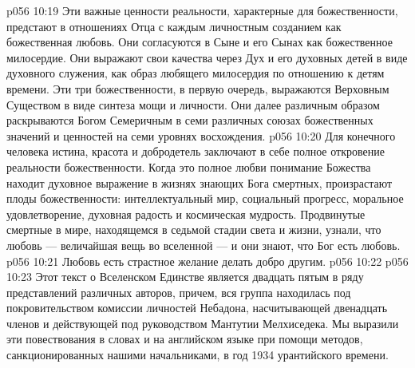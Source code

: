 \vs p056 10:19 Эти важные ценности реальности, характерные для божественности, предстают в отношениях Отца с каждым личностным созданием как божественная любовь. Они согласуются в Сыне и его Сынах как божественное милосердие. Они выражают свои качества через Дух и его духовных детей в виде духовного служения, как образ любящего милосердия по отношению к детям времени. Эти три божественности, в первую очередь, выражаются Верховным Существом в виде синтеза мощи и личности. Они далее различным образом раскрываются Богом Семеричным в семи различных союзах божественных значений и ценностей на семи уровнях восхождения.
\vs p056 10:20 \pc Для конечного человека истина, красота и добродетель заключают в себе полное откровение реальности божественности. Когда это полное любви понимание Божества находит духовное выражение в жизнях знающих Бога смертных, произрастают плоды божественности: интеллектуальный мир, социальный прогресс, моральное удовлетворение, духовная радость и космическая мудрость. Продвинутые смертные в мире, находящемся в седьмой стадии света и жизни, узнали, что любовь --- величайшая вещь во вселенной --- и они знают, что Бог есть любовь.
\vs p056 10:21 \pc Любовь есть страстное желание делать добро другим.
\vs p056 10:22 
\separatorline
\vsetoff
\vs p056 10:23 \pc Этот текст о Вселенском Единстве является двадцать пятым в ряду представлений различных авторов, причем, вся группа находилась под покровительством комиссии личностей Небадона, насчитывающей двенадцать членов и действующей под руководством Мантутии Мелхиседека. Мы выразили эти повествования в словах и на английском языке при помощи методов, санкционированных нашими начальниками, в год 1934 урантийского времени.
